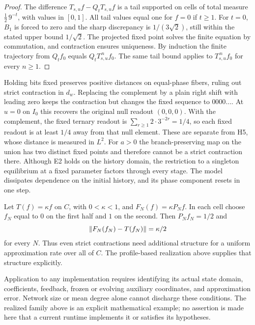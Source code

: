 \begin{proof}
The difference $T_{s,u}f-Q_tT_{s,u}f$ is a tail supported on cells of total measure $\tfrac12\,9^{-t}$, with values in $[0,1]$. All tail values equal one for $f=0$ if $t\geq1$. For $t=0$, $B_1$ is forced to zero and the sharp discrepancy is $1/(3\sqrt{2})$, still within the stated upper bound $1/\sqrt{2}$. The projected fixed point solves the finite equation by commutation, and contraction ensures uniqueness. By induction the finite trajectory from $Q_tf_0$ equals $Q_tT_{s,u}^{\,n}f_0$. The same tail bound applies to $T_{s,u}^{\,n}f_0$ for every $n\geq1$.
\end{proof}

\begin{remark}\label{rem:projective-dissipation-controls}
Holding bits fixed preserves positive distances on equal-phase fibers, ruling out strict contraction in $d_w$. Replacing the complement by a plain right shift with leading zero keeps the contraction but changes the fixed sequence to $0000\ldots$. At $u=0$ on $I_0$ this recovers the original null readout $(0,0,0)$. With the complement, the fixed ternary readout is $\sum_{r\geq1}2\cdot3^{-2r}=1/4$, so each fixed readout is at least $1/4$ away from that null element. These are separate from H5, whose distance is measured in $L^2$. For $a>0$ the branch-preserving map on the union has two distinct fixed points and therefore cannot be a strict contraction there. Although E2 holds on the history domain, the restriction to a singleton equilibrium at a fixed parameter factors through every stage. The model dissipates dependence on the initial history, and its phase component resets in one step.
\end{remark}


\begin{example}\label{ex:no-uniform-discretization}
Let $T(f)=\kappa f$ on $C$, with $0<\kappa<1$, and $F_N(f)=\kappa P_Nf$. In each cell choose $f_N$ equal to $0$ on the first half and $1$ on the second. Then $P_Nf_N=1/2$ and
\[
\left\lVert F_N(f_N)-T(f_N) \right\rVert=\kappa/2
\]
for every $N$. Thus even strict contractions need additional structure for a uniform approximation rate over all of $C$. The profile-based realization above supplies that structure explicitly.
\end{example}

\begin{remark}\label{rem:bridge-applicability}
Application to any implementation requires identifying its actual state domain, coefficients, feedback, frozen or evolving auxiliary coordinates, and approximation error. Network size or mean degree alone cannot discharge these conditions. The realized family above is an explicit mathematical example; no assertion is made here that a current runtime implements it or satisfies its hypotheses.
\end{remark}
